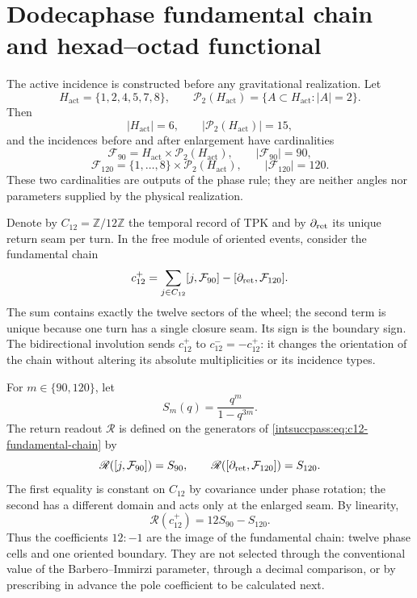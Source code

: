 \section{Dodecaphase fundamental chain and hexad--octad functional}

The active incidence is constructed before any gravitational realization.
Let
\[
 H_{\mathrm{act}}=\{1,2,4,5,7,8\},
 \qquad
 \mathcal P_2(H_{\mathrm{act}})
 =\{A\subset H_{\mathrm{act}}:|A|=2\}.
\]
Then
\[
 |H_{\mathrm{act}}|=6,
 \qquad
 |\mathcal P_2(H_{\mathrm{act}})|=15,
\]
and the incidences before and after enlargement have cardinalities
\[
 \mathcal F_{90}=H_{\mathrm{act}}\times
 \mathcal P_2(H_{\mathrm{act}}),
 \qquad |\mathcal F_{90}|=90,
\]
\[
 \mathcal F_{120}=\{1,\ldots,8\}\times
 \mathcal P_2(H_{\mathrm{act}}),
 \qquad |\mathcal F_{120}|=120.
\]
These two cardinalities are outputs of the phase rule; they are neither angles nor
parameters supplied by the physical realization.

Denote by \(C_{12}=\mathbb Z/12\mathbb Z\) the temporal record of TPK and
by \(\partial_{\rm ret}\) its unique return seam per turn. In the
free module of oriented events, consider the fundamental chain
\begin{equation}
 c_{12}^{+}
 =\sum_{j\in C_{12}}[j,\mathcal F_{90}]
  -[\partial_{\rm ret},\mathcal F_{120}].
 \label{intsuccpass:eq:c12-fundamental-chain}
\end{equation}
The sum contains exactly the twelve sectors of the wheel; the second
term is unique because one turn has a single closure seam. Its sign
is the boundary sign. The bidirectional involution sends
\(c_{12}^{+}\) to \(c_{12}^{-}=-c_{12}^{+}\): it changes the orientation of the
chain without altering its absolute multiplicities or its incidence
types.

For \(m\in\{90,120\}\), let
\[
 S_m(q)=\frac{q^m}{1-q^{3m}}.
\]
The return readout \(\mathscr R\) is defined on the generators of
\eqref{intsuccpass:eq:c12-fundamental-chain} by
\[
 \mathscr R([j,\mathcal F_{90}])=S_{90},
 \qquad
 \mathscr R([\partial_{\rm ret},\mathcal F_{120}])=S_{120}.
\]
The first equality is constant on \(C_{12}\) by covariance under
phase rotation; the second has a different domain and acts only at the
enlarged seam. By linearity,
\begin{equation}
 \boxed{\mathscr R(c_{12}^{+})=12S_{90}-S_{120}.}
 \label{intsuccpass:eq:dodecaphase-forces-12minus1}
\end{equation}
Thus the coefficients \(12:-1\) are the image of the fundamental chain: twelve
phase cells and one oriented boundary. They are not selected through the
conventional value of the Barbero--Immirzi parameter, through a decimal
comparison, or by prescribing in advance the pole coefficient to be calculated
next.

